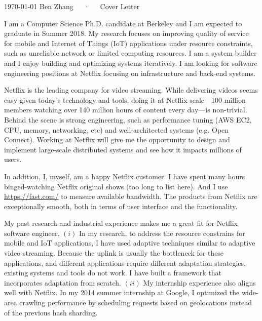 \documentclass[11pt, letterpaper]{awesome-cv}
\begin{document}
\makecvheader[R]
\makecvfooter
  {\today}
  {Ben Zhang~~~·~~~Cover Letter}
  {}

\makelettertitle

\begin{cvletter}


  I am a Computer Science Ph.D. candidate at Berkeley and I am expected to
  graduate in Summer 2018. My research focuses on improving quality of service
  for mobile and Internet of Things (IoT) applications under resource
  constraints, such as unreliable network or limited computing resources. I am a
  system builder and I enjoy building and optimizing systems iteratively. I am
  looking for software engineering positions at Netflix focusing on
  infrastructure and back-end systems.


  Netflix is the leading company for video streaming. While delivering videos
  seems easy given today's technology and tools, doing it at Netflix scale---100
  million members watching over 140 million hours of content every day---is
  non-trivial. Behind the scene is strong engineering, such as performance
  tuning (AWS EC2, CPU, memory, networking, etc) and well-architected systems
  (e.g. Open Connect). Working at Netflix will give me the opportunity to design
  and implement large-scale distributed systems and see how it impacts millions
  of users.

  In addition, I, myself, am a happy Netflix customer. I have spent many hours
  binged-watching Netflix original shows (too long to list here). And I use
  \url{https://fast.com/} to measure available bandwidth. The products from
  Netflix are exceptionally smooth, both in terms of user interface and the
  functionality.


  My past research and industrial experience makes me a great fit for Netflix
  software engineer. $(i)$ In my research, to address the resource constrains
  for mobile and IoT applications, I have used adaptive techniques similar to
  adaptive video streaming. Because the uplink is usually the bottleneck for
  these applications, and different applications require different adaptation
  strategies, existing systems and tools do not work. I have built a framework
  that incorporates adaptation from scratch. $(ii)$ My internship experience
  also aligns well with Netflix. In my 2014 summer internship at Google, I
  optimized the wide-area crawling performance by scheduling requests based on
  geolocations instead of the previous hash sharding.


\end{cvletter}
\end{document}
